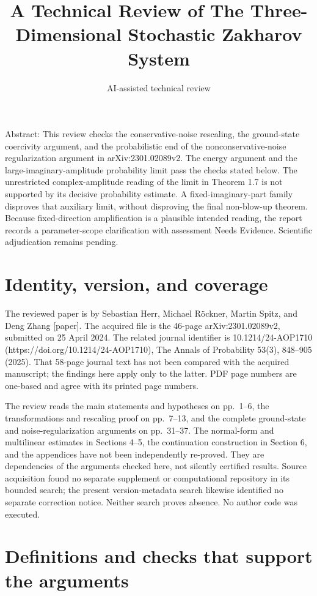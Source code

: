 \documentclass[10pt]{article}
\title{A Technical Review of
The Three-Dimensional Stochastic Zakharov System}
\author{AI-assisted technical review}
\date{}
\begin{document}
\maketitle
Abstract: This review checks the conservative-noise rescaling, the ground-state coercivity argument, and the probabilistic end of the nonconservative-noise regularization argument in arXiv:2301.02089v2. The energy argument and the large-imaginary-amplitude probability limit pass the checks stated below. The unrestricted complex-amplitude reading of the limit in Theorem 1.7 is not supported by its decisive probability estimate. A fixed-imaginary-part family disproves that auxiliary limit, without disproving the final non-blow-up theorem. Because fixed-direction amplification is a plausible intended reading, the report records a parameter-scope clarification with assessment Needs Evidence. Scientific adjudication remains pending.\par
\section*{Identity, version, and coverage}
The reviewed paper is by Sebastian Herr, Michael Röckner, Martin Spitz, and Deng Zhang [paper]. The acquired file is the 46-page arXiv:2301.02089v2, submitted on 25 April 2024. The related journal identifier is 10.1214/24-AOP1710 (https://doi.org/10.1214/24-AOP1710), The Annals of Probability 53(3), 848–905 (2025). That 58-page journal text has not been compared with the acquired manuscript; the findings here apply only to the latter. PDF page numbers are one-based and agree with its printed page numbers.\par
The review reads the main statements and hypotheses on pp. 1–6, the transformations and rescaling proof on pp. 7–13, and the complete ground-state and noise-regularization arguments on pp. 31–37. The normal-form and multilinear estimates in Sections 4–5, the continuation construction in Section 6, and the appendices have not been independently re-proved. They are dependencies of the arguments checked here, not silently certified results. Source acquisition found no separate supplement or computational repository in its bounded search; the present version-metadata search likewise identified no separate correction notice. Neither search proves absence. No author code was executed.\par
\section*{Definitions and checks that support the arguments}
\end{document}
